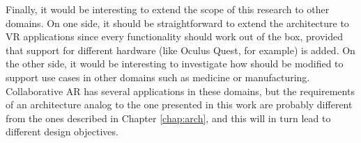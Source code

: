 Finally, it would be interesting to extend the scope of this research to other domains. On one side, it should be straightforward to extend the architecture to VR applications since every functionality should work out of the box, provided that support for different hardware (like Oculus Quest, for example) is added. On the other side, it would be interesting to investigate how \arch{} should be modified to support use cases in other domains such as medicine or manufacturing. Collaborative AR has several applications in these domains, but the requirements of an architecture analog to the one presented in this work are probably different from the ones described in Chapter \ref{chap:arch}, and this will in turn lead to different design objectives.

